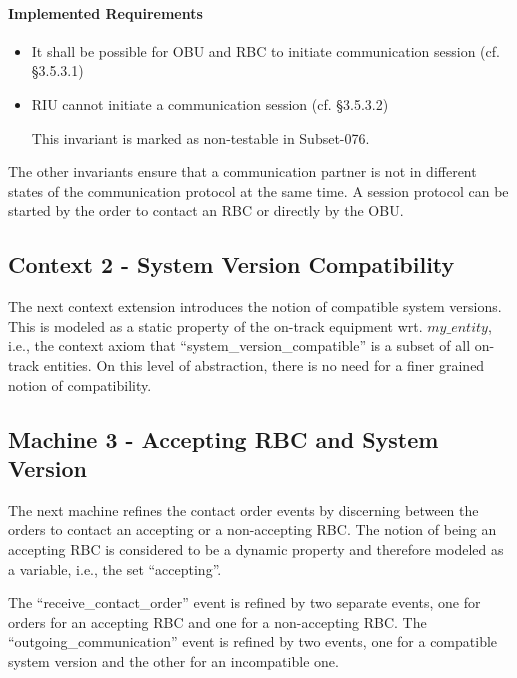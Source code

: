 \documentclass[10pt,a4paper]{article}
\begin{document}
\paragraph{Implemented Requirements}
\label{sec:impl-requ-1}

\begin{itemize}
\item It shall be possible for OBU and RBC to initiate communication session
  (cf. §3.5.3.1)
\item RIU cannot initiate a communication session (cf. §3.5.3.2)

This invariant is marked as non-testable in Subset-076.
\end{itemize}

The other invariants ensure that a communication partner is not in different
states of the communication protocol at the same time. A session protocol can be
started by the order to contact an RBC or directly by the OBU.



\subsection{Context 2 - System Version Compatibility}
\label{sec:context-2-system}

The next context extension introduces the notion of compatible system
versions. This is modeled as a static property of the on-track equipment
wrt. $my\_entity$, i.e., the context axiom that ``system\_version\_compatible''
is a subset of all on-track entities. On this level of abstraction, there is no
need for a finer grained notion of compatibility.



\subsection{Machine 3 - Accepting RBC and System Version}
\label{sec:machine-3-accepting}

The next machine refines the contact order events by discerning between the
orders to contact an accepting or a non-accepting RBC. The notion of being an
accepting RBC is considered to be a dynamic property and therefore modeled as a
variable, i.e., the set ``accepting''.

The ``receive\_contact\_order'' event is refined by two separate events, one for
orders for an accepting RBC and one for a non-accepting RBC. The
``outgoing\_communication'' event is refined by two events, one for a compatible
system version and the other for an incompatible one.
\end{document}
